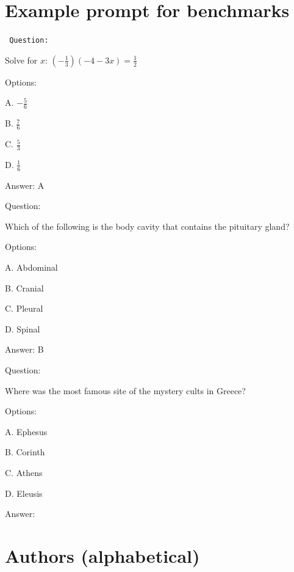 \documentclass[11pt]{article}
\begin{document}



\appendix
\section{Example prompt for benchmarks} \label{sec:prompt}
\begin{AIbox}{}
\tt \footnotesize 
Question:
 
Solve for $x$: $(-\frac{1}{3})(-4 -3x)=\frac{1}{2}$
 
Options:
 
A. $-\frac{5}{6}$

B. $\frac{7}{6}$

C. $\frac{5}{3}$

D. $\frac{1}{6}$
 
Answer: A

Question:

Which of the following is the body cavity that contains the pituitary gland?

Options: 

A. Abdominal

B. Cranial

C. Pleural

D. Spinal
 
Answer: B

Question:
 
Where was the most famous site of the mystery cults in Greece?

Options: 
 
A. Ephesus

B. Corinth

C. Athens

D. Eleusis

Answer:
 
\end{AIbox}

\section{Authors (alphabetical)}
\end{document}

